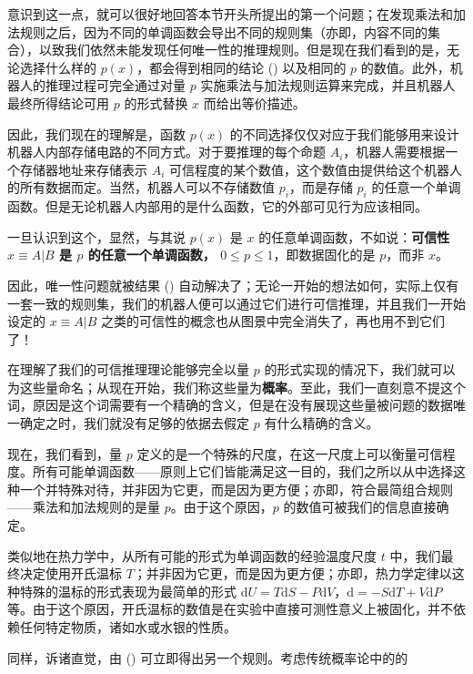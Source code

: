 意识到这一点，就可以很好地回答本节开头所提出的第一个问题；在发现乘法和加法规则之后，因为不同的单调函数会导出不同的规则集（亦即，内容不同的集合），以致我们依然未能发现任何唯一性的推理规则。但是现在我们看到的是，无论选择什么样的 $p(x)$，都会得到相同的结论 (\in[2-95]) 以及相同的 $p$ 的数值。此外，机器人的推理过程可完全通过对量 $p$ 实施乘法与加法规则运算来完成，并且机器人最终所得结论可用 $p$ 的形式替换 $x$ 而给出等价描述。

因此，我们现在的理解是，函数 $p(x)$ 的不同选择仅仅对应于我们能够用来设计机器人内部存储电路的不同方式。对于要推理的每个命题 $A_i$，机器人需要根据一个存储器地址来存储表示 $A_i$ 可信程度的某个数值，这个数值由提供给这个机器人的所有数据而定。当然，机器人可以不存储数值 $p_i$，而是存储 $p_i$ 的任意一个单调函数。但是无论机器人内部用的是什么函数，它的外部可见行为应该相同。

一旦认识到这个，显然，与其说 $p(x)$ 是 $x$ 的任意单调函数，不如说：{\bf 可信性 {\tf $x\equiv A|B$} 是 {\tf $p$} 的任意一个单调函数， {\tf $0\le p\le 1$}}，即数据固化的是 $p$，而非 $x$。

因此，唯一性问题就被结果 (\in[2-95]) 自动解决了；无论一开始的想法如何，实际上仅有一套一致的规则集，我们的机器人便可以通过它们进行可信推理，并且我们一开始设定的 $x\equiv A|B$ 之类的可信性的概念也从图景中完全消失了，再也用不到它们了！

在理解了我们的可信推理理论能够完全以量 $p$ 的形式实现的情况下，我们就可以为这些量命名；从现在开始，我们称这些量为{\bf 概率}。至此，我们一直刻意不提这个词，原因是这个词需要有一个精确的含义，但是在没有展现这些量被问题的数据唯一确定之时，我们就没有足够的依据去假定 $p$ 有什么精确的含义。

现在，我们看到，量 $p$ 定义的是一个特殊的尺度，在这一尺度上可以衡量可信程度。所有可能单调函数——原则上它们皆能满足这一目的，我们之所以从中选择这种一个并特殊对待，并非因为它更，而是因为更方便；亦即，符合最简组合规则——乘法和加法规则的是量 $p$。由于这个原因，$p$ 的数值可被我们的信息直接确定。

类似地在热力学中，从所有可能的形式为单调函数的经验温度尺度 $t$ 中，我们最终决定使用开氏温标 $T$；并非因为它更，而是因为更方便；亦即，热力学定律以这种特殊的温标的形式表现为最简单的形式 ${\mathrm{d}}U=T{\mathrm{d}}S - P{\mathrm{d}}V$，${\mathrm{d}} = -S{\mathrm{d}}T + V{\mathrm{d}}P$ 等。由于这个原因，开氏温标的数值是在实验中直接可测性意义上被固化，并不依赖任何特定物质，诸如水或水银的性质。

同样，诉诸直觉，由 (\in[2-95]) 可立即得出另一个规则。考虑传统概率论中的的